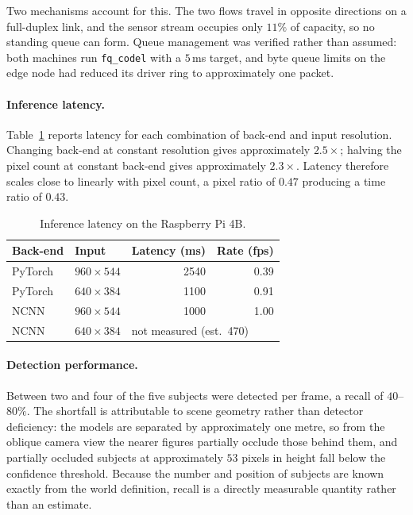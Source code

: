 Two mechanisms account for this. The two flows travel in opposite directions
on a full-duplex link, and the sensor stream occupies only \(11\%\) of
capacity, so no standing queue can form. Queue management was verified rather
than assumed: both machines run \texttt{fq\_codel} with a \(5\)\,ms target,
and byte queue limits on the edge node had reduced its driver ring to
approximately one packet.

\paragraph{Inference latency.}
Table~\ref{tab:hitl-inference} reports latency for each combination of back-end
and input resolution. Changing back-end at constant resolution gives
approximately \(2.5\times\); halving the pixel count at constant back-end gives
approximately \(2.3\times\). Latency therefore scales close to linearly with
pixel count, a pixel ratio of \(0.47\) producing a time ratio of \(0.43\).

\begin{table}[htbp]
\centering
\caption{Inference latency on the Raspberry Pi 4B.}
\label{tab:hitl-inference}
\begin{tabular}{llrr}
\toprule
Back-end & Input & Latency (ms) & Rate (fps) \\
\midrule
PyTorch & $960 \times 544$ & 2540 & 0.39 \\
PyTorch & $640 \times 384$ & 1100 & 0.91 \\
NCNN    & $960 \times 544$ & 1000 & 1.00 \\
NCNN    & $640 \times 384$ & \multicolumn{2}{l}{not measured (est.\ 470)} \\
\bottomrule
\end{tabular}
\end{table}

\paragraph{Detection performance.}
Between two and four of the five subjects were detected per frame, a recall of
\(40\)--\(80\%\). The shortfall is attributable to scene geometry rather than
detector deficiency: the models are separated by approximately one metre, so from
the oblique camera view the nearer figures partially occlude those behind them,
and partially occluded subjects at approximately \(53\) pixels in height fall
below the confidence threshold. Because the number and position of subjects are
known exactly from the world definition, recall is a directly measurable quantity
rather than an estimate.

